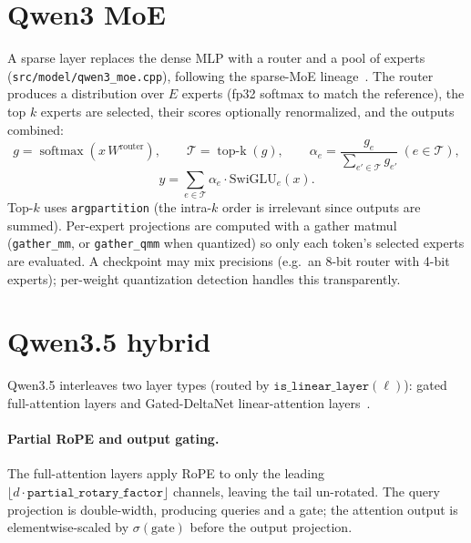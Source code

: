 \documentclass[11pt,a4paper]{report}
\newcommand{\code}[1]{\texttt{#1}}
\newcommand{\softmax}{\operatorname{softmax}}
\begin{document}
\section{Qwen3 MoE}
A sparse layer replaces the dense MLP with a router and a pool of experts
(\code{src/model/qwen3\_moe.cpp}), following the sparse-MoE
lineage~\citep{fedus2022switch,jiang2024mixtral}. The router produces a distribution
over $E$ experts (fp32 softmax to match the reference), the top $k$ experts are
selected, their scores optionally renormalized, and the outputs combined:
\begin{equation}
  g = \softmax(x\,W^{\text{router}}), \qquad
  \mathcal{T} = \operatorname{top\text{-}k}(g), \qquad
  \alpha_e = \frac{g_e}{\sum_{e'\in\mathcal{T}} g_{e'}}\ (e\in\mathcal{T}),
\end{equation}
\begin{equation}
  y = \sum_{e\in\mathcal{T}} \alpha_e \cdot \text{SwiGLU}_e(x).
\end{equation}
Top-$k$ uses \code{argpartition} (the intra-$k$ order is irrelevant since outputs are
summed). Per-expert projections are computed with a gather matmul
(\code{gather\_mm}, or \code{gather\_qmm} when quantized) so only each token's
selected experts are evaluated. A checkpoint may mix precisions (e.g.\ an 8-bit
router with 4-bit experts); per-weight quantization detection handles this
transparently.

\section{Qwen3.5 hybrid}
Qwen3.5 interleaves two layer types (routed by
$\code{is\_linear\_layer}(\ell)$): gated full-attention layers and Gated-DeltaNet
linear-attention layers~\citep{yang2024gateddeltanet}.

\paragraph{Partial RoPE and output gating.} The full-attention layers apply RoPE to
only the leading $\lfloor d\cdot\texttt{partial\_rotary\_factor}\rfloor$ channels,
leaving the tail un-rotated. The query projection is double-width, producing queries
and a gate; the attention output is elementwise-scaled by $\sigma(\text{gate})$
before the output projection.
\end{document}
